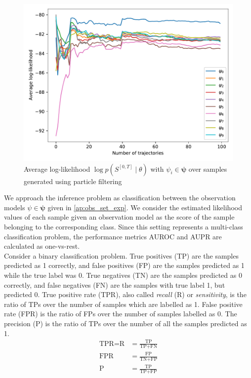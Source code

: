\begin{figure}[H]
	\begin{center}
		\includegraphics[width=.75\textwidth]{figures/roc_analysis/roc_particleFilter/llh_particleFilter_psi_0}
		\caption{Average log-likelihood $ \log p(S^{[0,T]} \mid \theta) $ with $ \psi_i \in \symbf{\psi} $ over samples generated using particle filtering}
		\label{fig:llh_particle}
	\end{center}
\end{figure}
We approach the inference problem as classification between the observation models $ \psi \in \symbf{\psi} $ given in \cref{ap:obs_set_exp}. We consider the estimated likelihood values of each sample given an observation model as the score of the sample belonging to the corresponding class. Since this setting represents a multi-class classification problem, the
performance metrics AUROC and AUPR are calculated as one-vs-rest. \\ %
Consider a binary classification problem. True positives (TP) are the samples predicted as 1 correctly, and false positives (FP) are the samples predicted as 1 while the true label was 0. True negatives (TN) are the samples predicted as 0 correctly, and false negatives (FN) are the samples with true label 1, but predicted 0. True positive rate (TPR), also called \textit{recall} (R) or \textit{sensitivity}, is the ratio of TPs over the number of samples which are labelled as 1. False positive rate (FPR) is the ratio of FPs over the number of samples labelled as 0. The precision (P) is the ratio of TPs over the number of all the samples predicted as 1.
\begin{align}
\text{TPR} = \text{R} &= \frac{\text{TP}}{\text{TP} + \text{FN}} \\
\text{FPR} &= \frac{\text{FP}}{\text{TN} + \text{FP}} \\
\text{P} &= \frac{\text{TP}}{\text{TP} + \text{FP}}
\end{align}
